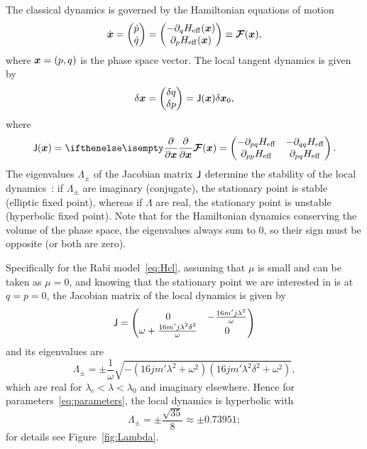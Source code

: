 \documentclass[a4paper,11pt,twoside]{article}
\begin{document}
The classical dynamics is governed by the Hamiltonian equations of motion
\begin{equation}
	\dot{\boldsymbol{x}}=\begin{pmatrix}\dot{p} \\ \dot{q}\end{pmatrix}=\begin{pmatrix}-\partial_{q}H_{\mathrm{eff}}(\boldsymbol{x}) \\ \partial_{p}H_{\mathrm{eff}}(\boldsymbol{x})\end{pmatrix}\equiv\boldsymbol{\mathcal{F}}(\boldsymbol{x}),
\end{equation}
where $\boldsymbol{x}=(p,q)$ is the phase space vector.
The local tangent dynamics is given by
\begin{equation}
	\delta\boldsymbol{x}=\begin{pmatrix}\delta q \\ \delta p\end{pmatrix}=\mathsf{J}(\boldsymbol{x})\delta\boldsymbol{x}_{0},
\end{equation}
where
\begin{equation}
	\matrix{J}(\vector{x})=\partialderivative{}{\vector{x}}\vector{\mathcal{F}}(\vector{x})=\makematrix{-\partial_{pq}H_{\mathrm{eff}} & -\partial_{qq}H_{\mathrm{eff}} \\ \partial_{pp}H_{\mathrm{eff}} & \partial_{pq}H_{\mathrm{eff}}}.
\end{equation}
The eigenvalues $\Lambda_{\pm}$ of the Jacobian matrix $\mathsf{J}$ determine the stability of the local dynamics~\cite{Tabor1989,PilatowskyCameo2020}: if $\Lambda_{\pm}$ are imaginary (conjugate), the stationary point is stable (elliptic fixed point), whereas if $\Lambda$ are real, the stationary point is unstable (hyperbolic fixed point).
Note that for the Hamiltonian dynamics conserving the volume of the phase space, the eigenvalues always sum to $0$, so their sign must be opposite (or both are zero).

Specifically for the Rabi model~\eqref{eq:Hcl}, assuming that $\mu$ is small and can be taken as $\mu=0$, and knowing that the stationary point we are interested in is at $q=p=0$, the Jacobian matrix of the local dynamics is given by
\begin{equation}
	\mathsf{J}=\begin{pmatrix}
		0 & -\frac{16 m' j \lambda^{2}}{\omega} \\
		\omega+\frac{16 m' j\lambda^{2}\delta^{2}}{\omega} & 0
	\end{pmatrix}
\end{equation}
and its eigenvalues are
\begin{equation}
	\Lambda_{\pm}=\pm\frac{1}{\omega}\sqrt{-\left(16jm'\lambda^{2}+\omega^{2}\right)\left(16jm'\lambda^{2}\delta^{2}+\omega^{2}\right)},
\end{equation}
which are real for $\lambda_{c}<\lambda<\lambda_{0}$ and imaginary elsewhere.
Hence for parameters~\eqref{eq:parameters}, the local dynamics is hyperbolic with 
\begin{equation}
	\Lambda_{\pm}=\pm\frac{\sqrt{35}}{8}\approx\pm0.73951;
\end{equation}
for details see Figure~\ref{fig:Lambda}.
\end{document}
